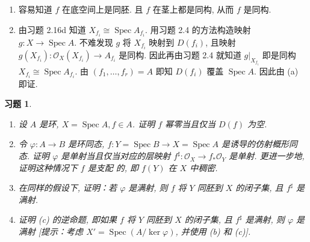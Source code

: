 \documentclass{article}
\theoremstyle{exercise}
\newtheorem{exercise}{习题}[section]
\newenvironment{proofc}{\proof}{\endproof}
\def\cO{\mathscr{O}}
\def\Spec{\operatorname{Spec}}
\begin{document}
\begin{proofc}
  \begin{enumerate}[label={(\alph*)}]
    \item 容易知道 $f$ 在底空间上是同胚. 且 $f$ 在茎上都是同构, 从而 $f$ 是同构.

    \item 由习题 2.16d 知道 $X_{f_i} \cong \Spec A_{f_i}$.
          用习题 2.4 的方法构造映射 $g \colon X \to \Spec A$.
          不难发现 $g$ 将 $X_{f_i}$ 映射到 $D(f_i)$,
          且映射 $g(X_{f_i}) \colon \cO_X(X_{f_i}) \to A_{f_i}$ 是同构.
          因此再由习题 2.4 就知道 $g|_{X_{f_i}}$ 即是同构 $X_{f_i} \cong \Spec A_{f_i}$.
          由 $(f_1, \dots, f_r) = A$ 即知 $D(f_i)$ 覆盖 $\Spec A$. 因此由 (a) 即证.
          \qedhere
  \end{enumerate}
\end{proofc}

\begin{exercise}
  \begin{enumerate}[label={(\alph*)}]
          本习题中, 我们将比较环同态的若干性质和其诱导的谱的同态的性质.
    \item 设 $A$ 是环, $X = \Spec A, f \in A$. 证明 $f$ 幂零当且仅当 $D(f)$ 为空.
    \item 令 $\varphi \colon A \to B$ 是环同态, $f \colon Y = \Spec B \to X = \Spec A$
          是诱导的仿射概形同态.
          证明 $\varphi$ 是单射当且仅当对应的层映射 $f^\sharp \colon \cO_X \to f_* \cO_Y$ 是单射.
          更进一步地, 证明这种情况下 $f$ 是\emph{支配} 的, 即 $f(Y)$ 在 $X$ 中稠密.
    \item 在同样的假设下, 证明：若 $\varphi$ 是满射, 则 $f$ 将 $Y$ 同胚到 $X$ 的闭子集,
          且 $f^\sharp$ 是满射.
    \item 证明 (c) 的逆命题, 即如果 $f$ 将 $Y$ 同胚到 $X$ 的闭子集,
          且 $f^\sharp$ 是满射, 则 $\varphi$ 是满射
          [提示：考虑 $X' = \Spec(A / \ker \varphi)$, 并使用 (b) 和 (c)].
  \end{enumerate}
\end{exercise}
\end{document}
